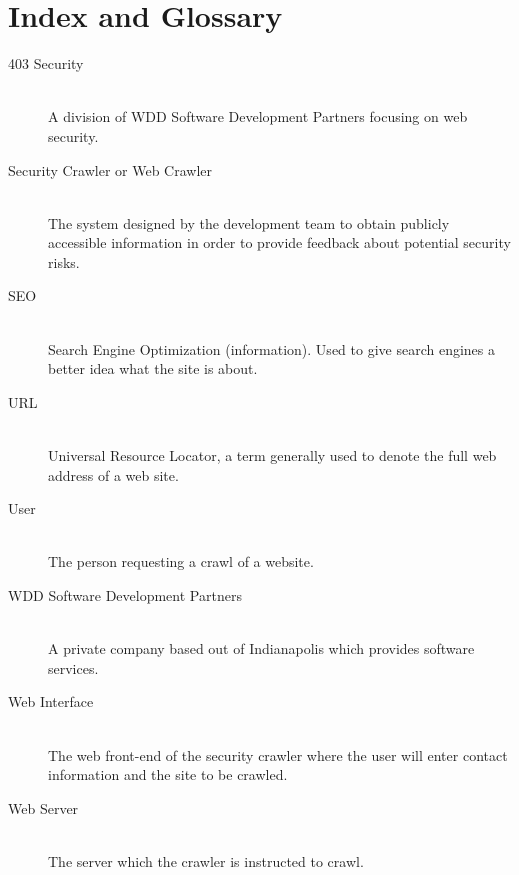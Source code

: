 \section{Index and Glossary}
\begin{description}
    \item[403 Security] \hfill \\
        A division of WDD Software Development Partners focusing on web security.
    \item[Security Crawler or Web Crawler] \hfill \\
        The system designed by the development team to obtain publicly accessible information in order to provide feedback about potential security risks.
    \item[SEO]\hfill \\
        Search Engine Optimization (information).  Used to give search engines a better idea what the site is about.
    \item[URL]\hfill \\
Universal Resource Locator, a term generally used to denote the full web address of a web site.
\item[User]\hfill \\
The person requesting a crawl of a website.
\item[WDD Software Development Partners]\hfill \\
A private company based out of Indianapolis which provides software services.
\item[Web Interface] \hfill \\
The web front-end of the security crawler where the user will enter contact information and the site to be crawled.
\item[Web Server]\hfill \\
The server which the crawler is instructed to crawl.

\end{description}
